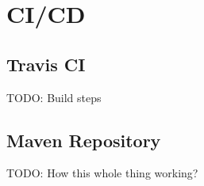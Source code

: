 \section{CI/CD}
\subsection{Travis CI}
TODO: Build steps
\subsection{Maven Repository}
TODO: How this whole thing working?